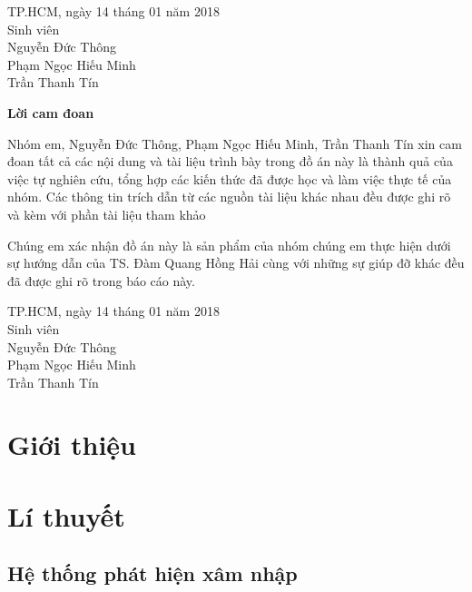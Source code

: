 \documentclass[12pt,twoside]{report}
\begin{document}
\hfill
\begin{minipage}[t]{0.48\textwidth}
	\begin{center}
		TP.HCM, ngày 14 tháng 01 năm 2018\\
		Sinh viên\\
		Nguyễn Đức Thông\\
		Phạm Ngọc Hiếu Minh\\
		Trần Thanh Tín\\
	\end{center}
\end{minipage}
\newpage
\begin{center}
	{\LARGE \textbf{Lời cam đoan}}
\end{center}
\par
Nhóm em, Nguyễn Đức Thông, Phạm Ngọc Hiếu Minh, Trần Thanh Tín xin cam đoan tất cả các nội dung và tài liệu trình bày trong đồ án này là thành quả của việc tự nghiên cứu, tổng hợp các kiến thức đã được học và làm việc thực tế của nhóm. Các thông tin trích dẫn từ các nguồn tài liệu khác nhau đều được ghi rõ và kèm với phần tài liệu tham khảo
\par
Chúng em xác nhận đồ án này là sản phẩm của nhóm chúng em thực hiện dưới sự hướng dẫn của TS. Đàm Quang Hồng Hải cùng với những sự giúp đỡ khác đều đã được ghi rõ trong báo cáo này.

\hfill
\begin{minipage}[t]{0.48\textwidth}
	\begin{center}
		TP.HCM, ngày 14 tháng 01 năm 2018\\
		Sinh viên\\
		Nguyễn Đức Thông\\
		Phạm Ngọc Hiếu Minh\\
		Trần Thanh Tín\\
	\end{center}
\end{minipage}
\newpage
\tableofcontents
\listoffigures
\listoftables
\newpage
{}
\chapter{Giới thiệu}

\newpage
\chapter{Lí thuyết}
\section{Hệ thống phát hiện xâm nhập}

\end{document}
